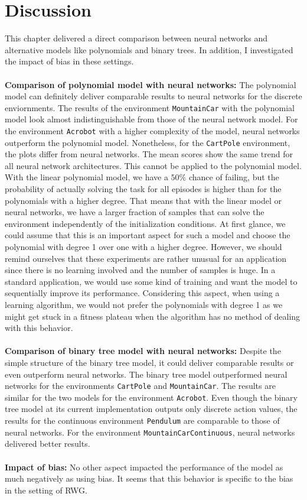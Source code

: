 \section{Discussion}
This chapter delivered a direct comparison between neural networks and alternative models like polynomials and binary trees. In addition, I investigated the impact of bias in these settings.
\\ \\
\textbf{Comparison of polynomial model with neural networks:}
The polynomial model can definitely deliver comparable results to neural networks for the discrete enviornments. The results of the environment \texttt{MountainCar} with the polynomial model look almost indistinguishable from those of the neural network model. For the environment \texttt{Acrobot} with a higher complexity of the model, neural networks outperform the polynomial model. Nonetheless, for the \texttt{CartPole} environment, the plots differ from neural networks. The mean scores show the same trend for all neural network architectures. This cannot be applied to the polynomial model. With the linear polynomial model, we have a $50 \%$ chance of failing, but the probability of actually solving the task for all episodes is higher than for the polynomials with a higher degree. That means that with the linear model or neural networks, we have a larger fraction of samples that can solve the environment independently of the initialization conditions. At first glance, we could assume that this is an important aspect for such a model and choose the polynomial with degree 1 over one with a higher degree. However, we should remind ourselves that these experiments are rather unusual for an application since there is no learning involved and the number of samples is huge. In a standard application, we would use some kind of training and want the model to sequentially improve its performance. Considering this aspect, when using a learning algorithm, we would not prefer the polynomials with degree 1 as we might get stuck in a fitness plateau when the algorithm has no method of dealing with this behavior.
\\ \\
\textbf{Comparison of binary tree model with neural networks:} Despite the simple structure of the binary tree model, it could deliver comparable results or even outperform neural networks. The binary tree model outperformed neural networks for the environments \verb|CartPole| and \verb|MountainCar|. The results are similar for the two models for the environment \verb|Acrobot|. Even though the binary tree model at its current implementation outputs only discrete action values, the results for the continuous environment \verb|Pendulum| are comparable to those of neural networks. For the environment \verb|MountainCarContinuous|, neural networks delivered better results.
\\ \\
\textbf{Impact of bias:} No other aspect impacted the performance of the model as much negatively as using bias. It seems that this behavior is specific to the bias in the setting of RWG.

